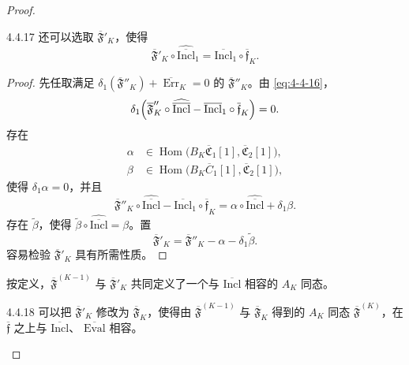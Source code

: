 \begin{proof}
\begin{lemma}{4.4.17}\label{lem:4-4-17}
还可以选取 $\overline{\mathfrak F}'_K$，使得
\[
 \overline{\mathfrak F}'_K
 \circ\widehat{\overline{\mathrm{Incl}}}_1
 =\overline{\mathrm{Incl}}_1
 \circ\overline{\mathfrak f}_K.
\]
\end{lemma}

\begin{proof}
先任取满足
$\delta_1(\overline{\mathfrak F}''_K)
+\overline{\operatorname{Err}}_K=0$ 的
$\overline{\mathfrak F}''_K$。由 \eqref{eq:4-4-16}，
\[
 \delta_1\Bigl(
 \overline{\mathfrak F}''_K
 \circ\widehat{\overline{\mathrm{Incl}}}
 -\overline{\mathrm{Incl}}_1
 \circ\overline{\mathfrak f}_K
 \Bigr)=0.
\]
存在
\[
 \begin{aligned}
 \alpha&\in\operatorname{Hom}\bigl(
 B_K\overline{\mathfrak C}_1[1],
 \overline{\mathfrak C}_2[1]\bigr),\\
 \beta&\in\operatorname{Hom}\bigl(
 B_K\overline C_1[1],
 \overline{\mathfrak C}_2[1]\bigr),
 \end{aligned}
\]
使得 $\delta_1\alpha=0$，并且
\[
 \overline{\mathfrak F}''_K
 \circ\widehat{\overline{\mathrm{Incl}}}
 -\overline{\mathrm{Incl}}_1
 \circ\overline{\mathfrak f}_K
 =\alpha\circ\widehat{\overline{\mathrm{Incl}}}
 +\delta_1\beta.
\]
存在 $\widetilde\beta$，使得
$\widetilde\beta\circ\widehat{\overline{\mathrm{Incl}}}=\beta$。置
\[
 \overline{\mathfrak F}'_K
 =\overline{\mathfrak F}''_K-\alpha-\delta_1\widetilde\beta.
\]
容易检验 $\overline{\mathfrak F}'_K$ 具有所需性质。
\end{proof}

按定义，$\overline{\mathfrak F}^{(K-1)}$ 与
$\overline{\mathfrak F}'_K$ 共同定义了一个与
$\overline{\mathrm{Incl}}$ 相容的 $A_K$ 同态。

\begin{lemma}{4.4.18}\label{lem:4-4-18}
可以把 $\overline{\mathfrak F}'_K$ 修改为
$\overline{\mathfrak F}_K$，使得由
$\overline{\mathfrak F}^{(K-1)}$ 与 $\overline{\mathfrak F}_K$ 得到的
$A_K$ 同态 $\overline{\mathfrak F}^{(K)}$，在
$\overline{\mathfrak f}$ 之上与 $\overline{\mathrm{Incl}}$、
$\overline{\mathrm{Eval}}$ 相容。
\end{lemma}


\end{proof}
